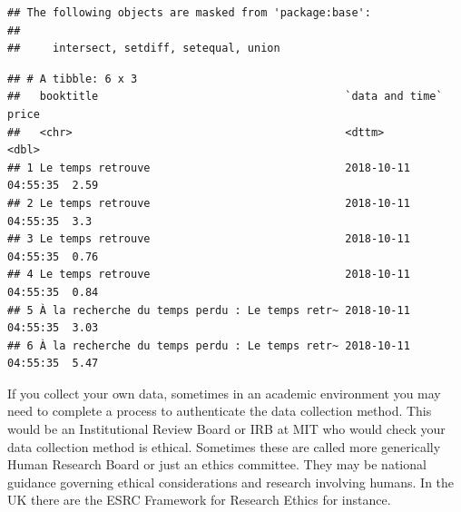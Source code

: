 \documentclass[]{book}
\newenvironment{Shaded}{\begin{snugshade}}{\end{snugshade}}
\newcommand{\KeywordTok}[1]{\textcolor[rgb]{0.13,0.29,0.53}{\textbf{#1}}}
\newcommand{\StringTok}[1]{\textcolor[rgb]{0.31,0.60,0.02}{#1}}
\newcommand{\OperatorTok}[1]{\textcolor[rgb]{0.81,0.36,0.00}{\textbf{#1}}}
\newcommand{\NormalTok}[1]{#1}
\theoremstyle{definition}
\theoremstyle{definition}
\theoremstyle{definition}
\theoremstyle{remark}
\begin{document}
\begin{verbatim}
## The following objects are masked from 'package:base':
## 
##     intersect, setdiff, setequal, union
\end{verbatim}

\begin{Shaded}
\end{Shaded}

\begin{verbatim}
## # A tibble: 6 x 3
##   booktitle                                      `data and time`     price
##   <chr>                                          <dttm>              <dbl>
## 1 Le temps retrouve                              2018-10-11 04:55:35  2.59
## 2 Le temps retrouve                              2018-10-11 04:55:35  3.3 
## 3 Le temps retrouve                              2018-10-11 04:55:35  0.76
## 4 Le temps retrouve                              2018-10-11 04:55:35  0.84
## 5 À la recherche du temps perdu : Le temps retr~ 2018-10-11 04:55:35  3.03
## 6 À la recherche du temps perdu : Le temps retr~ 2018-10-11 04:55:35  5.47
\end{verbatim}

If you collect your own data, sometimes in an academic environment you
may need to complete a process to authenticate the data collection
method. This would be an Institutional Review Board or IRB at MIT who
would check your data collection method is ethical. Sometimes these are
called more generically Human Research Board or just an ethics
committee. They may be national guidance governing ethical
considerations and research involving humans. In the UK there are the
ESRC Framework for Research Ethics for instance.
\end{document}

